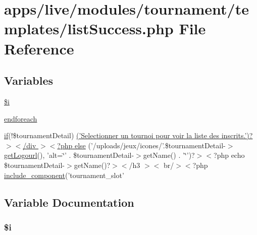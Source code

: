 \hypertarget{live_2modules_2tournament_2templates_2list_success_8php}{\section{apps/live/modules/tournament/templates/list\-Success.php File Reference}
\label{live_2modules_2tournament_2templates_2list_success_8php}
}
\subsection*{Variables}
\begin{DoxyCompactItemize}
\item 
\hyperlink{live_2modules_2tournament_2templates_2list_success_8php_a83018d9153d17d91fbcf3bc10158d34f}{\$i}
\item 
\hyperlink{live_2modules_2tournament_2templates_2list_success_8php_a672d9707ef91db026c210f98cc601123}{endforeach}
\item 
\hyperlink{live_2modules_2tournament_2templates_2__form_team_8php_ae30a307b320d8da5d9a945eaf68f7549}{if}(!\$tournament\-Detail) \hyperlink{live_2modules_2tournament_2templates_2list_success_8php_a66a4da4db315f7aff11e218f221c66fe}{('\-Selectionner un tournoi pour voir la liste des inscrits.')?$>$$<$/div $>$$<$?php else} ('/uploads/jeux/icones/'.\$tournament\-Detail-\/$>$\hyperlink{backend_2modules_2tournament_2templates_2index_success_8php_a35941bec2f3cf7beef9b8010a1342325}{get\-Logourl}(), 'alt=\char`\"{}' . \$tournament\-Detail-\/$>$get\-Name() . '\char`\"{}')?$>$$<$?php echo \$tournament\-Detail-\/$>$get\-Name()?$>$$<$/h3 $>$$<$ br/$>$$<$?php \hyperlink{frontend_2templates_2__navigation_8php_a0f87936cfbec594a177cabbcec470b8d}{include\-\_\-component}('tournament\-\_\-slot'
\end{DoxyCompactItemize}


\subsection{Variable Documentation}
\hypertarget{live_2modules_2tournament_2templates_2list_success_8php_a83018d9153d17d91fbcf3bc10158d34f}{
\subsubsection[{\$i}]{\setlength{\rightskip}{0pt plus 5cm}\${\bf i}}}\label{live_2modules_2tournament_2templates_2list_success_8php_a83018d9153d17d91fbcf3bc10158d34f}


